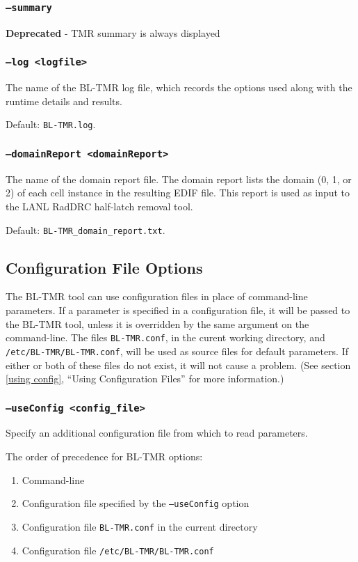 \documentclass[english]{article}
\begin{document}
\subsubsection{\texttt{--summary}}
\textbf{Deprecated} - TMR summary is always displayed

\subsubsection{\texttt{--log <logfile>}}
The name of the BL-TMR log file, which records the options used along with
the runtime details and results. 

Default: \texttt{BL-TMR.log}.

\subsubsection{\texttt{--domainReport <domainReport>}}
The name of the domain report file. The domain report lists the domain (0, 1, 
or 2) of each cell instance in the resulting EDIF file. This report is used as 
input to the LANL RadDRC half-latch removal tool. 

Default: \texttt{BL-TMR\_domain\_report.txt}.

\subsection{Configuration File Options}
\label{config options}
The BL-TMR tool can use configuration files in place of command-line parameters. 
If a parameter is specified in a configuration file, it will be passed to the 
BL-TMR tool, unless it is overridden by the same argument on the command-line. 
The files \texttt{BL-TMR.conf}, in the curent working directory, and 
\texttt{/etc/BL-TMR/BL-TMR.conf}, will be used as source files for default 
parameters. If either or both of these files do not exist, it will not cause a 
problem. (See section \ref{using config}, ``Using Configuration Files'' for
more information.)

\subsubsection{\texttt{--useConfig <config\_file>}}
\label{useConfig}
Specify an additional configuration file from which to read parameters.

The order of precedence for BL-TMR options:
\begin{enumerate}
  \item Command-line
  \item Configuration file specified by the \texttt{--useConfig} option
  \item Configuration file \texttt{BL-TMR.conf} in the current directory
  \item Configuration file \texttt{/etc/BL-TMR/BL-TMR.conf}
\end{enumerate}
\end{document}
